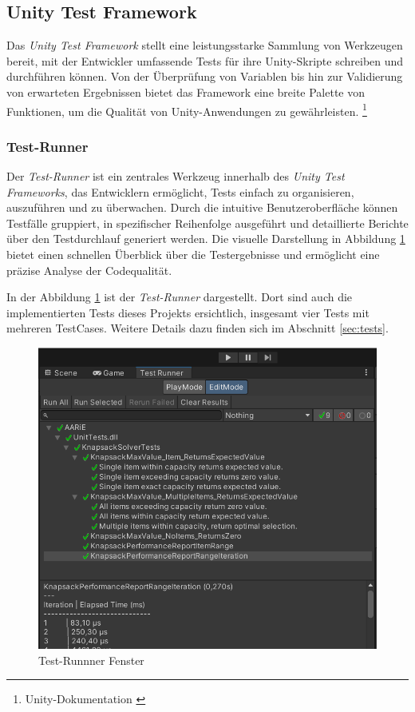 \subsection{\label{sec:testFramework}Unity Test Framework}

Das \textit{Unity Test Framework} stellt eine leistungsstarke Sammlung von Werkzeugen bereit, mit der Entwickler umfassende Tests für ihre Unity-Skripte schreiben und durchführen können. Von der Überprüfung von Variablen bis hin zur Validierung von erwarteten
Ergebnissen bietet das Framework eine breite Palette von Funktionen, um die Qualität von Unity-Anwendungen zu gewährleisten. \footnote{Unity-Dokumentation \cite{UnityTestFramework}}

\subsubsection{\label{sec:testRunner} Test-Runner}

Der \textit{Test-Runner} ist ein zentrales Werkzeug innerhalb des \textit{Unity Test Frameworks}, das Entwicklern ermöglicht, Tests einfach zu organisieren, auszuführen und zu überwachen. Durch die intuitive Benutzeroberfläche können Testfälle gruppiert, in spezifischer Reihenfolge ausgeführt und detaillierte Berichte über den Testdurchlauf generiert werden. Die visuelle Darstellung in Abbildung \ref{fig:testRunner} bietet einen schnellen Überblick über die Testergebnisse und ermöglicht eine präzise Analyse der Codequalität.

In der Abbildung \ref{fig:testRunner} ist der \textit{Test-Runner} dargestellt. Dort sind auch die implementierten Tests dieses Projekts ersichtlich, insgesamt vier Tests mit mehreren TestCases. Weitere Details dazu finden sich im Abschnitt \ref{sec:tests}.

\begin{figure}[H]
\centering
\includegraphics[scale=0.5, angle=0]{images/testRunner}
\caption{Test-Runnner Fenster}
\label{fig:testRunner}
\end{figure}

